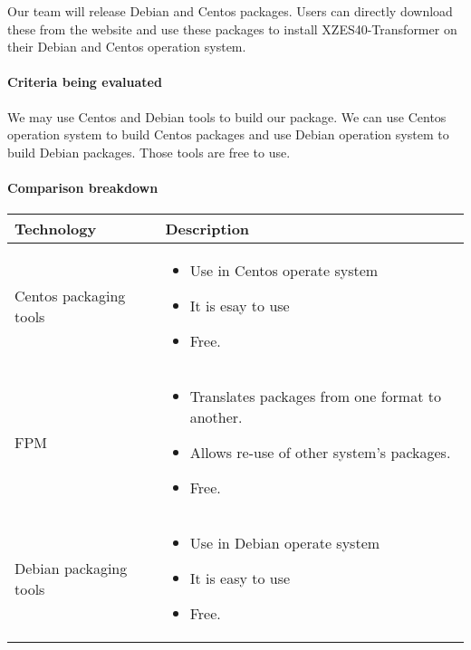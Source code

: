 Our team will release Debian and Centos packages.
Users can directly download these from the website and use these packages to install XZES40-Transformer on their Debian and Centos operation system.

\paragraph{Criteria being evaluated}

We may use Centos and Debian tools to build our package.
We can use Centos operation system to build Centos packages and use Debian operation system to build Debian packages.
Those tools are free to use.

\paragraph{Comparison breakdown}

\begin{center}
  \begin{tabular}{ | l | p{10cm} |}
    \hline
    Technology & Description  \\ \hline
    Centos packaging tools \cite{centos-tool} &
    \begin{itemize}
      \item Use in Centos operate system 
      \item It is esay to use
      \item Free.
    \end{itemize}\\ \hline
    FPM \cite{fpm-home} &
    \begin{itemize}
      \item Translates packages from one format to another.
      \item Allows re-use of other system's packages.
      \item Free.
    \end{itemize}\\ \hline
    Debian packaging tools \cite{debian-tool} &
    \begin{itemize}
      \item Use in Debian operate system
      \item It is easy to use
      \item Free.
    \end{itemize}\\ \hline
  \end{tabular}
\end{center}

